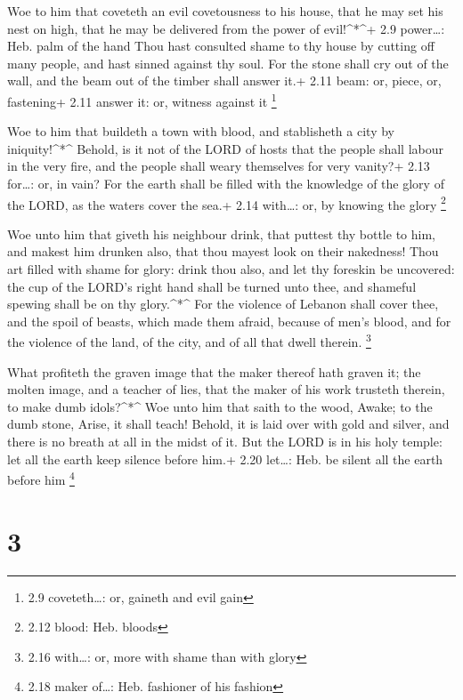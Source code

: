  Woe to him that coveteth an evil covetousness to his house,
that he may set his nest on high, that he may be delivered from the
power of evil!\^{}*\^{}+ 2.9 power\ldots: Heb. palm of the hand
 Thou hast consulted shame to thy house by cutting off many
people, and hast sinned against thy soul.  For the stone
shall cry out of the wall, and the beam out of the timber shall answer
it.+ 2.11 beam: or, piece, or, fastening+ 2.11 answer it: or, witness
against it \footnote{2.9 coveteth\ldots: or, gaineth and evil gain}

 Woe to him that buildeth a town with blood, and
stablisheth a city by iniquity!\^{}*\^{}  Behold, is it not
of the LORD of hosts that the people shall labour in the very fire, and
the people shall weary themselves for very vanity?+ 2.13 for\ldots: or,
in vain?  For the earth shall be filled with the knowledge
of the glory of the LORD, as the waters cover the sea.+ 2.14 with\ldots:
or, by knowing the glory \footnote{2.12 blood: Heb. bloods}

 Woe unto him that giveth his neighbour drink, that puttest
thy bottle to him, and makest him drunken also, that thou mayest look on
their nakedness!  Thou art filled with shame for glory:
drink thou also, and let thy foreskin be uncovered: the cup of the
LORD's right hand shall be turned unto thee, and shameful spewing shall
be on thy glory.\^{}*\^{}  For the violence of Lebanon
shall cover thee, and the spoil of beasts, which made them afraid,
because of men's blood, and for the violence of the land, of the city,
and of all that dwell therein. \footnote{2.16 with\ldots: or, more with
  shame than with glory}

 What profiteth the graven image that the maker thereof
hath graven it; the molten image, and a teacher of lies, that the maker
of his work trusteth therein, to make dumb idols?\^{}*\^{} 
Woe unto him that saith to the wood, Awake; to the dumb stone, Arise, it
shall teach! Behold, it is laid over with gold and silver, and there is
no breath at all in the midst of it.  But the LORD is in
his holy temple: let all the earth keep silence before him.+ 2.20
let\ldots: Heb. be silent all the earth before him \footnote{2.18 maker
  of\ldots: Heb. fashioner of his fashion}

\hypertarget{section-2}{%
\section{3}\label{section-2}}

